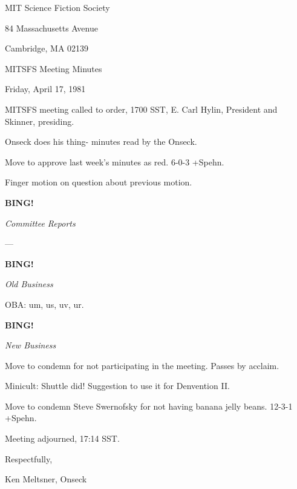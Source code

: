 \documentclass[12pt]{article}
\newcommand{\bing}{{\bf BING!} }
\newcommand{\goto}[1]{\bing \vskip 12pt \centerline{{\em{#1}}}}
\begin{document}
\begin{center}

MIT Science Fiction Society 

84 Massachusetts Avenue

Cambridge, MA 02139

\vspace{12pt}

MITSFS Meeting Minutes 

Friday, April 17, 1981

\end{center}
 
\vspace{18pt}

\setlength{\parskip}{6pt}

\noindent
MITSFS meeting called to order, 1700 SST,
E. Carl Hylin, President and Skinner, presiding.

Onseck does his thing- minutes read by the Onseck.

Move to approve last week's minutes as red. 6-0-3 +Spehn.

Finger motion on question about previous motion.

\goto{Committee Reports}

---

\goto{Old Business}

OBA: um, us, uv, ur.

\goto{New Business}

Move to condemn for not participating in the meeting. Passes by acclaim.

Minicult: Shuttle did! Suggestion to use it for Denvention II.

Move to condemn Steve Swernofsky for not having banana jelly beans. 12-3-1 +Spehn.

\vspace{12pt}

\noindent
Meeting adjourned, 17:14 SST.

\vspace{18pt}

\centerline{Respectfully,}
\centerline{Ken Meltsner, Onseck}
\end{document}
